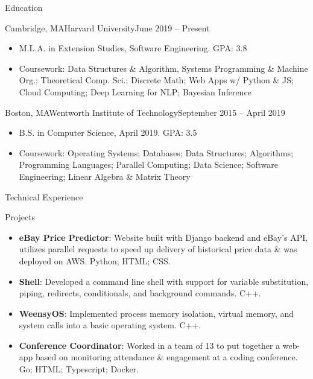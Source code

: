 \documentclass[]{mcdowellcv}
\begin{document}
	\begin{cvsection}{Education}
		\begin{cvsubsection}{Cambridge, MA}{Harvard University}{June 2019 -- Present}
		
			\begin{itemize}
				\item M.L.A. in Extension Studies, Software Engineering. GPA: 3.8
				\item Coursework: Data Structures \& Algorithm, Systems Programming \& Machine Org.; Theoretical Comp. Sci.; Discrete Math; Web Apps w/ Python \& JS; Cloud Computing; Deep Learning for NLP; Bayesian Inference
				\end{itemize}
		\end{cvsubsection}
		\begin{cvsubsection}{Boston, MA}{Wentworth Institute of Technology}{September 2015 -- April 2019}
		\vspace{2mm}
			\begin{itemize}
				\item B.S. in Computer Science, April 2019. GPA: 3.5
				\item Coursework: Operating Systems; Databases; Data Structures; Algorithms; Programming Languages; Parallel Computing; Data Science; Software Engineering; Linear Algebra \& Matrix Theory
			\end{itemize}
		\end{cvsubsection}
	\end{cvsection}
	
	\begin{cvsection}{Technical Experience}
		\begin{cvsubsection}{Projects}{}{}
			\begin{itemize}
				\item \textbf{eBay Price Predictor}: Website built with Django backend and eBay's API, utilizes parallel requests to speed up delivery of historical price data \& was deployed on AWS. Python; HTML; CSS.
				\item \textbf{Shell}: Developed a command line shell with support for variable substitution, piping, redirects, conditionals, and background commands. C++.
				\item \textbf{WeensyOS}: Implemented process memory isolation, virtual memory, and system calls into a basic operating system. C++.
				\item \textbf{Conference Coordinator}: Worked in a team of 13 to put together a web-app based on monitoring attendance \& engagement at a coding conference. Go; HTML; Typescript; Docker.
			\end{itemize}
		\end{cvsubsection}
	\end{cvsection}
	
\end{document}
